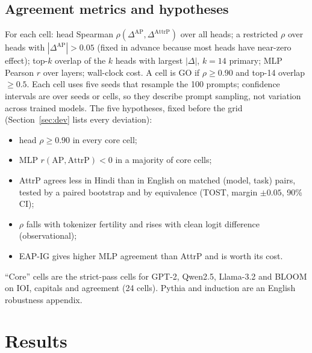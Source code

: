 \documentclass[10pt,a4paper]{article}
\newcommand{\AP}{\mathrm{AP}}
\newcommand{\AttrP}{\mathrm{AttrP}}
\begin{document}
\subsection{Agreement metrics and hypotheses}
For each cell: head Spearman $\rho(\Delta^{\AP},\Delta^{\AttrP})$ over all heads; a restricted $\rho$ over heads with $|\Delta^{\AP}|>0.05$ (fixed in advance because most heads have near-zero effect); top-$k$ overlap of the $k$ heads with largest $|\Delta|$, $k=14$ primary; MLP Pearson $r$ over layers; wall-clock cost. A cell is GO if $\rho\ge0.90$ and top-14 overlap $\ge0.5$. Each cell uses five seeds that resample the 100 prompts; confidence intervals are over seeds or cells, so they describe prompt sampling, not variation across trained models. The five hypotheses, fixed before the grid (Section~\ref{sec:dev} lists every deviation):
\begin{itemize}
\item[\textbf{H1}] head $\rho\ge0.90$ in every core cell;
\item[\textbf{H2}] MLP $r(\AP,\AttrP)<0$ in a majority of core cells;
\item[\textbf{H3}] AttrP agrees less in Hindi than in English on matched (model, task) pairs, tested by a paired bootstrap and by equivalence (TOST, margin $\pm0.05$, 90\% CI);
\item[\textbf{H4}] $\rho$ falls with tokenizer fertility and rises with clean logit difference (observational);
\item[\textbf{H5}] EAP-IG gives higher MLP agreement than AttrP and is worth its cost.
\end{itemize}
``Core'' cells are the strict-pass cells for GPT-2, Qwen2.5, Llama-3.2 and BLOOM on IOI, capitals and agreement (24 cells). Pythia and induction are an English robustness appendix.

\section{Results}
\end{document}
